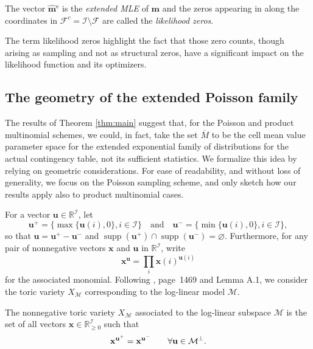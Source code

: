 \documentclass[aos,MSNbibl,nameyear,dvips]{arximspdf}
\newcommand{\m}[1]{\mathrm{#1}}
\begin{document}
\begin{definition}
The vector $\widehat{\mathbf{m}}{}^{\m{e}}$ is the \textit{extended
MLE} of $\mathbf{m}$ and the zeros appearing in along the coordinates
in $\mathcal{F}^c = \mathcal{I} \setminus\mathcal{F}$ are called the
{\it likelihood zeros}.\vspace*{-2pt}
\end{definition}

The term likelihood zeros highlight the fact that those zero counts,
though arising as sampling and not as structural zeros, have a
significant impact on the likelihood function and its optimizers.\vspace*{-2pt}

\subsection{The geometry of the extended Poisson family}\label{sec:variety}

The results of Theorem \ref{thm:main} suggest that, for the Poisson and
product multinomial schemes, we could, in fact, take the set
$\overline{M}$ to be the cell mean value parameter space for the
extended exponential family of distributions for the actual contingency
table, not its sufficient statistics. We formalize this idea by relying
on geometric considerations. For ease of readability, and without loss
of generality, we focus on the Poisson sampling scheme, and only
sketch how our results apply also to product multinomial cases.

For a vector $\mathbf{u} \in\mathbb{R}^\mathcal{I}$, let
%
\[
\mathbf{u}^+ = \bigl\{ \max\{ \mathbf{u}(i),0 \}, i \in\mathcal{I}\bigr\}
\quad\mbox{and}\quad  \mathbf{u}^- = \bigl\{ \min\{ \mathbf{u}(i),0 \}, i
\in \mathcal{I}\bigr\},
\]
%
so that $\mathbf{u} = \mathbf{u}^+ - \mathbf{u}^-$ and
$\operatorname{supp}(\mathbf{u}^+)
\cap\operatorname{supp}(\mathbf{u}^-) =\varnothing$. Furthermore, for any
pair of nonnegative vectors $\mathbf{x}$ and $\mathbf{u}$ in
$\mathbb{R}^\mathcal{I}$, write
%
\[
\mathbf{x}^\mathbf{u} = \prod_{i} \mathbf{x}(i)^{\mathbf{u}(i)}
\]
%
for the associated monomial. Following \citet{GMS06}, page~1469 and
Lemma A.1, we consider the toric variety $X_\mathcal{M}$ corresponding
to the log-linear model $\mathcal{M}$.\vspace*{-2pt}

\begin{definition}
The nonnegative toric variety $X_\mathcal{M}$ associated to the
log-linear subspace $\mathcal{M}$ is the set of all vectors $\mathbf{x}
\in\mathbb{R}^\mathcal{I}_{\geq0}$ such that
%
\begin{equation}\label{eq:toric}
\mathbf{x}^{\mathbf{u}^+} = \mathbf{x}^{\mathbf{u}^-} \qquad
 \forall\mathbf{u} \in \mathcal{M}^\bot.\vspace*{-2pt}
\end{equation}
%
\end{definition}
\end{document}
